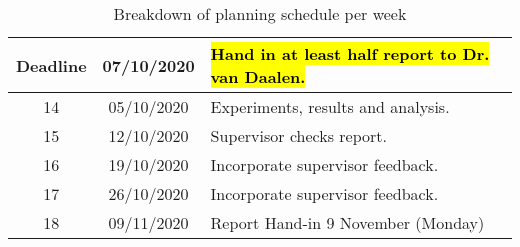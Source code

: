 \begin{table}[H]
\begin{center}
\begin{tabular}{|c|c|p{8cm}|}
      Deadline & 07/10/2020 & \hl{Hand in at least half report to Dr. van Daalen.}\\ \hline
      
      
      14 & 05/10/2020 & Experiments, results and analysis.\\ \hline
      15 & 12/10/2020 & Supervisor checks report.\\ \hline
      16 & 19/10/2020 & Incorporate supervisor feedback.\\ \hline
      17 & 26/10/2020 & Incorporate supervisor feedback.\\ \hline
      18 & 09/11/2020 &  Report Hand-in 9 November (Monday)\\ 
      
      \hline
    \end{tabular}
  \end{center}
  \caption{Breakdown of planning schedule per week}
    \label{tab:tablea1}
\end{table}